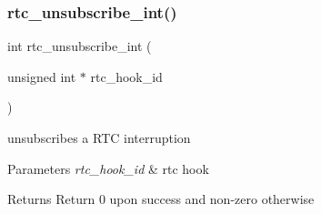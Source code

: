 \subsubsection{\texorpdfstring{rtc\+\_\+unsubscribe\+\_\+int()}{rtc\_unsubscribe\_int()}}
{\footnotesize\ttfamily int rtc\+\_\+unsubscribe\+\_\+int (\begin{DoxyParamCaption}\item[{unsigned int $\ast$}]{rtc\+\_\+hook\+\_\+id }\end{DoxyParamCaption})}



unsubscribes a R\+TC interruption 


\begin{DoxyParams}{Parameters}
{\em rtc\+\_\+hook\+\_\+id} & rtc hook\\
\hline
\end{DoxyParams}
\begin{DoxyReturn}{Returns}
Return 0 upon success and non-\/zero otherwise 
\end{DoxyReturn}
